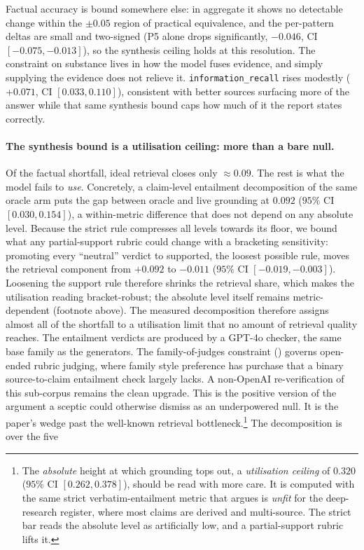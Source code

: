\documentclass[11pt]{article}
\newcommand{\dimrow}[1]{\texttt{#1}}
\begin{document}
Factual accuracy is bound somewhere else: in aggregate it shows no detectable change within the
$\pm0.05$ region of practical equivalence, and the per-pattern
deltas are small and two-signed (P5 alone drops significantly, $-0.046$, CI $[-0.075, -0.013]$),
so the synthesis ceiling holds at this resolution. The constraint on substance lives in how the
model fuses evidence, and simply supplying the evidence does not relieve it. \dimrow{information\_recall} rises modestly
($+0.071$, CI $[0.033, 0.110]$), consistent with better sources surfacing more of the
answer while that same synthesis bound caps how much of it the report states correctly.

\paragraph{The synthesis bound is a utilisation ceiling: more than a bare null.} Of the factual
shortfall, ideal retrieval closes only $\approx\!0.09$. The rest is what the model fails to
\emph{use}. Concretely, a claim-level entailment decomposition of the same oracle arm puts the gap
between oracle and live grounding at $0.092$ ($95\%$ CI $[0.030, 0.154]$), a within-metric
difference that does not depend on any absolute level. Because the strict rule compresses
all levels towards its floor, we bound what any partial-support rubric could change with a
bracketing sensitivity: promoting every ``neutral'' verdict to supported, the loosest
possible rule, moves the retrieval component from $+0.092$ to $-0.011$ ($95\%$ CI
$[-0.019, -0.003]$). Loosening the support rule therefore shrinks the retrieval
share, which makes the utilisation reading bracket-robust; the absolute level itself remains
metric-dependent (footnote above). The measured decomposition therefore assigns almost
all of the shortfall to a utilisation limit that no amount of retrieval quality reaches.
The entailment verdicts are produced by a GPT-4o checker, the same base family as the
generators. The family-of-judges constraint () governs open-ended rubric judging,
where family style preference has purchase that a binary source-to-claim entailment check
largely lacks. A non-OpenAI re-verification of this sub-corpus remains the clean upgrade.
This is the positive
version of the argument a sceptic could otherwise dismiss as an underpowered null. It is
the paper's wedge past the well-known retrieval bottleneck.\footnote{The \emph{absolute} height at which
grounding tops out, a \emph{utilisation ceiling} of $0.320$ ($95\%$ CI $[0.262, 0.378]$), should be
read with more care. It is computed with the same strict verbatim-entailment
metric that  argues is \emph{unfit} for the deep-research register, where most
claims are derived and multi-source. The strict bar reads the absolute level as artificially low,
and a partial-support rubric lifts it.} The decomposition is over the five
\end{document}
